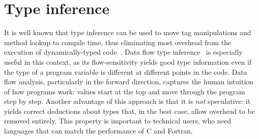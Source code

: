 \documentclass[10pt, preprint]{sigplanconf}
\begin{document}



\section{Type inference}
\label{sec:inference}

It is well known that type inference can be used to move tag manipulations
and method lookup to compile time, thus eliminating most overhead from
the execution of dynamically-typed code~\cite{Kaplan1977,Kaplan1980}.
Data flow type inference~\cite{Nielson2005,Khedker2009}
is especially useful in this context, as its
flow-sensitivity yields good type information even if the type of a program
variable is different at different points in the code.
Data flow analysis, particularly in the
forward direction, captures the human intuition of how programs work:
values start at the top and move through the program step by step.
Another advantage of this approach is that it is \emph{not} speculative:
it yields correct deductions about types that, in the best case, allow
overhead to be removed entirely. This property is important to technical
users, who need languages that can match the performance of C and Fortran.
\end{document}
